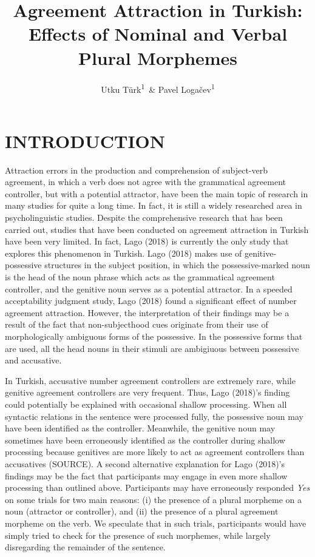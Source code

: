\documentclass[doc]{apa6}
\title{Agreement Attraction in Turkish: Effects of Nominal and Verbal Plural
Morphemes}
\author{Utku Türk\textsuperscript{1}~\& Pavel Logačev\textsuperscript{1}}
\date{}
\begin{document}
\maketitle

\section{INTRODUCTION}\label{introduction}

Attraction errors in the production and comprehension of subject-verb
agreement, in which a verb does not agree with the grammatical agreement
controller, but with a potential attractor, have been the main topic of
research in many studies for quite a long time. In fact, it is still a
widely researched area in psycholinguistic studies. Despite the
comprehensive research that has been carried out, studies that have been
conducted on agreement attraction in Turkish have been very limited. In
fact, Lago (2018) is currently the only study that explores this
phenomenon in Turkish. Lago (2018) makes use of genitive-possessive
structures in the subject position, in which the possessive-marked noun
is the head of the noun phrase which acts as the grammatical agreement
controller, and the genitive noun serves as a potential attractor. In a
speeded acceptability judgment study, Lago (2018) found a significant
effect of number agreement attraction. However, the interpretation of
their findings may be a result of the fact that non-subjecthood cues
originate from their use of morphologically ambiguous forms of the
possessive. In the possessive forms that are used, all the head nouns in
their stimuli are ambigiuous between possessive and accusative.

In Turkish, accusative number agreement controllers are extremely rare,
while genitive agreement controllers are very frequent. Thus, Lago
(2018)'s finding could potentially be explained with occasional shallow
processing. When all syntactic relations in the sentence were processed
fully, the possessive noun may have been identified as the controller.
Meanwhile, the genitive noun may sometimes have been erroneously
identified as the controller during shallow processing because genitives
are more likely to act as agreement controllers than accusatives
(SOURCE). A second alternative explanation for Lago (2018)'s findings
may be the fact that participants may engage in even more shallow
processing than outlined above. Participants may have erroneously
responded \emph{Yes} on some trials for two main reasons: (i) the
presence of a plural morpheme on a noun (attractor or controller), and
(ii) the presence of a plural agreement morpheme on the verb. We
speculate that in such trials, participants would have simply tried to
check for the presence of such morphemes, while largely disregarding the
remainder of the sentence.
\end{document}
